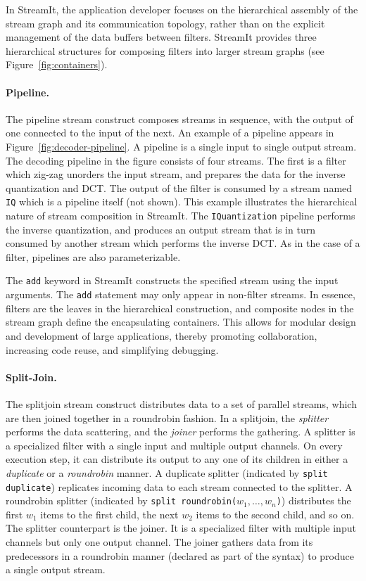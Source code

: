 In StreamIt, the application developer focuses on the hierarchical
assembly of the stream graph and its communication topology, rather
than on the  explicit management of the data buffers between filters.
StreamIt provides three hierarchical structures for composing filters
into larger stream graphs (see Figure~\ref{fig:containers}).

\paragraph{Pipeline.}
The pipeline stream construct composes streams in sequence, with
the output of one connected to the input of the next.  An example of a
pipeline appears in Figure~\ref{fig:decoder-pipeline}. A pipeline is a
single input to single output stream. The decoding pipeline in the
figure consists of four streams. The first is a filter which zig-zag
unorders the input stream, and prepares the data for the inverse
quantization and DCT. The output of the filter is consumed by a stream
named {\tt IQ} which is a pipeline itself (not shown). This example
illustrates the hierarchical nature of stream composition in
StreamIt. The {\tt IQuantization} pipeline performs the inverse quantization, and
produces an output stream that is in turn consumed by another stream
which performs the inverse DCT. As in the case of a filter, pipelines
are also parameterizable.

The {\tt add} keyword in StreamIt constructs the specified stream
using the input arguments. The {\tt add} statement may only appear in
non-filter streams.  In essence, filters are the leaves in the
hierarchical construction, and composite nodes in the stream graph
define the encapsulating containers. This allows for modular design
and development of large applications, thereby  promoting
collaboration, increasing code reuse, and simplifying debugging.

\paragraph{Split-Join.}
The splitjoin stream construct distributes data to a set of parallel
streams, which are then joined together in a roundrobin fashion. In a
splitjoin, the {\it splitter} performs the data scattering, and the
{\it joiner} performs the gathering. A splitter is a specialized
filter with a single input and multiple output channels. On every
execution step, it can distribute its output to any one of its
children in either a {\it duplicate} or a {\it roundrobin} manner.  A
duplicate splitter (indicated by \texttt{split duplicate}) replicates
incoming data to each stream connected to the splitter.  A
roundrobin splitter (indicated by {\tt split
roundrobin($w_1,\ldots,w_n$)}) distributes the first $w_1$ items to
the first child, the next $w_2$ items to the second child, and so
on.  The splitter counterpart is the joiner. It is a specialized
filter with multiple input channels but only one output channel. The
joiner gathers data from its predecessors in a roundrobin manner
(declared as part of the syntax) to produce a single output stream.

